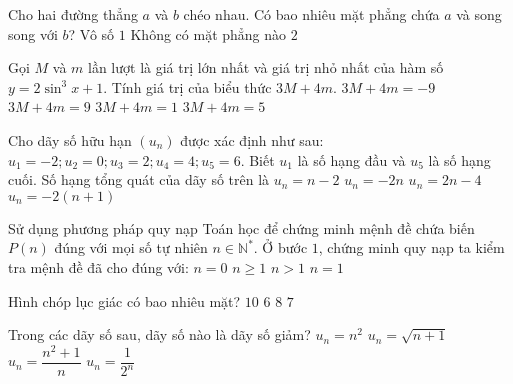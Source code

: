 \begin{ex}%
Cho hai đường thẳng $a$ và $b$ chéo nhau. Có bao nhiêu mặt phẳng chứa $a$ và song song với $b$?
	\choice
	{Vô số}
	{\True $1$}
	{Không có mặt phẳng nào}
	{$2$}
\end{ex}
\begin{ex}%
Gọi $M$ và $m$ lần lượt là giá trị lớn nhất và giá trị nhỏ nhất của hàm số $y=2\sin^3x+1$. Tính giá trị của biểu thức $3M+4m$.
\choice
{$3M+4m=-9$}
{$3M+4m=9$}
{$3M+4m=1$}
{\True $3M+4m=5$}
\end{ex}
\begin{ex}%
Cho dãy số hữu hạn $\left(u_n\right)$ được xác định như sau: $u_1=-2;u_2=0;u_3=2;u_4=4;u_5=6$. Biết $u_1$ là số hạng đầu và $u_5$ là số hạng cuối. Số hạng tổng quát của dãy số trên là
	\choice
	{$u_n=n-2$}
	{$u_n=-2n$}
	{\True $u_n=2n-4$}
	{$u_n=-2(n+1)$}
\end{ex}
\begin{ex}%
	Sử dụng phương pháp quy nạp Toán học để chứng minh mệnh đề chứa biến $P(n)$ đúng với mọi số tự nhiên $n\in {\mathbb{N}}^{*}$. Ở bước $1$, chứng minh quy nạp ta kiểm tra mệnh đề đã cho đúng với:
\choice
	{$n=0$}
	{$n\geqslant 1$}
	{$n>1$}
	{\True $n=1$}
\end{ex}
\begin{ex}%
Hình chóp lục giác có bao nhiêu mặt?
\choice
	{$10$}
	{$6$}
	{$8$}
	{\True $7$}
\end{ex}
\begin{ex}%
	Trong các dãy số sau, dãy số nào là dãy số giảm?
\choice
	{$u_n=n^2$}
	{$u_n=\sqrt{n+1}$}
	{$u_n=\dfrac{n^2+1}{n}$}
	{\True $u_n=\dfrac{1}{2^n}$}
\end{ex}
